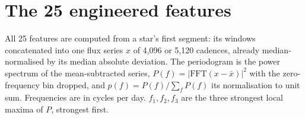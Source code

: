 \documentclass{article}
\begin{document}
\begin{table}[H]
\caption{Paired star-bootstrap of the four contrasts the body counts. Each entry is the 95\% interval
of (left arm $-$ right arm) over 1{,}000 resamples of the test stars, seeds averaged, and the share of
resamples with the difference above zero ($f_{>0}$; 1.00 means the left arm is ahead in every
resample, 0.00 that it is behind in every resample). Bold: interval excludes zero.}
\label{tab:bootstrap}
\centering
\scriptsize
\setlength{\tabcolsep}{2pt}

\end{table}

\section{The 25 engineered features}
\label{app:features}

All 25 features are computed from a star's first segment: its windows concatenated into one flux
series $x$ of 4{,}096 or 5{,}120 cadences, already median-normalised by its median absolute
deviation. The periodogram is the power spectrum of the mean-subtracted series,
$P(f) = |\mathrm{FFT}(x - \bar{x})|^{2}$ with the zero-frequency bin dropped, and
$p(f) = P(f)/\sum_f P(f)$ its normalisation to unit sum. Frequencies are in cycles per day.
$f_{1}, f_{2}, f_{3}$ are the three strongest local maxima of $P$, strongest first.
\end{document}
